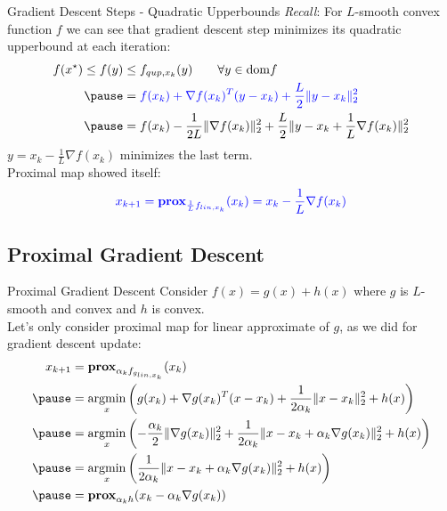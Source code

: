 \documentclass{beamer}
\DeclareMathOperator*{\argmin}{argmin}
\begin{document}
\begin{frame}{Gradient Descent Steps - Quadratic Upperbounds}
\textit{Recall}: For $L$-smooth convex function $f$ we can see that gradient descent step minimizes its quadratic upperbound at each iteration:
\begin{eqnarray*}
    \begin{aligned}
    f(x^\star)\leq f(y)&\leq f_{qup,x_k}(y)\qquad\forall y\in\mathrm{dom}f\\
    \pause
    &={\color{blue}f(x_k)+\nabla f(x_k)^T(y-x_k)+\frac{L}{2}\|y-x_k\|_2^2}\\
    \pause
    &=f(x_k)-\frac{1}{2L} \|\nabla f(x_k)\|_2^2 +\frac{L}{2}\|y-x_k+\frac{1}{L}\nabla f(x_k)\|_2^2
    \end{aligned}
\end{eqnarray*}
$y=x_k-\frac{1}{L}\nabla f(x_k)$ minimizes the last term.\\
\pause\vspace{20pt}
Proximal map showed itself:
\begin{align*}
\color{blue}x_{k+1}=\mathbf{prox}_{\frac{1}{L} f_{lin,x_k}}(x_k)=x_k-\frac{1}{L}\nabla f(x_k)
\end{align*}
\end{frame}

\subsection{Proximal Gradient Descent}
\begin{frame}{Proximal Gradient Descent}
Consider $f(x)=g(x)+h(x)$ where $g$ is $L$-smooth and convex and $h$ is convex.\\
\vspace{10pt}
\pause
Let's only consider proximal map for linear approximate of $g$, as we did for gradient descent update:
\begin{eqnarray*}
    \begin{aligned}
    x_{k+1}&=\mathbf{prox}_{\alpha_k f_{g_{lin,x_k}}}(x_k)\\
    \pause
    &=\argmin_{x}\left(g(x_k)+\nabla g(x_k)^T(x-x_k)+\frac{1}{2\alpha_k}\|x-x_k\|_2^2+h(x)\right)\\
    \pause
    &=\argmin_{x}\left(-\frac{\alpha_k}{2} \|\nabla g(x_k)\|_2^2 +\frac{1}{2\alpha_k}\|x-x_k+\alpha_k\nabla g(x_k)\|_2^2+h(x)\right)\\
    \pause
    &=\argmin_{x}\left(\frac{1}{2\alpha_k}\|x-x_k+\alpha_k\nabla g(x_k)\|_2^2+h(x)\right)\\
    \pause
    &=\mathbf{prox}_{\alpha_kh}(x_k-\alpha_k\nabla g(x_k))
    \end{aligned}
\end{eqnarray*}
\end{frame}
\end{document}
